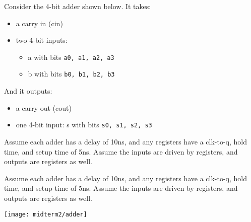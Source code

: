 \begin{blocksection}
\question
Consider the 4-bit adder shown below. It takes:
\begin{itemize}
  \item a carry in (cin)
  \item two 4-bit inputs:
  \begin{itemize}
      \item a with bits \lstinline$a0, a1, a2, a3$
      \item b with bits \lstinline$b0, b1, b2, b3$
  \end{itemize}
\end{itemize}
And it outputs:
\begin{itemize}
  \item a carry out (cout)
  \item one 4-bit input: s with bits \lstinline$s0, s1, s2, s3$
\end{itemize}

Assume each adder has a delay of 10ns, and any registers have a clk-to-q, hold time, and setup time of 5ns. Assume the inputs are driven by registers, and outputs are registers as well.

Assume each adder has a delay of 10ns, and any registers have a clk-to-q, hold time, and setup time of 5ns. Assume the inputs are driven by registers, and outputs are registers as well.

\texttt{[image: midterm2/adder]}

\end{blocksection}
